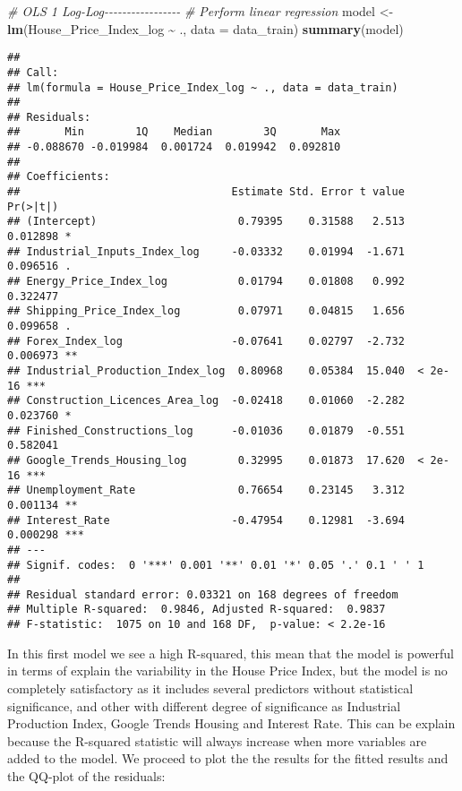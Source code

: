 \documentclass[
]{article}
\newenvironment{Shaded}{\begin{snugshade}}{\end{snugshade}}
\newcommand{\AttributeTok}[1]{\textcolor[rgb]{0.13,0.29,0.53}{#1}}
\newcommand{\CommentTok}[1]{\textcolor[rgb]{0.56,0.35,0.01}{\textit{#1}}}
\newcommand{\FunctionTok}[1]{\textcolor[rgb]{0.13,0.29,0.53}{\textbf{#1}}}
\newcommand{\NormalTok}[1]{#1}
\newcommand{\OtherTok}[1]{\textcolor[rgb]{0.56,0.35,0.01}{#1}}
\newcommand{\SpecialCharTok}[1]{\textcolor[rgb]{0.81,0.36,0.00}{\textbf{#1}}}
\begin{document}
\begin{Shaded}
\begin{Highlighting}[]
\CommentTok{\# OLS 1 Log{-}Log{-}{-}{-}{-}{-}{-}{-}{-}{-}{-}{-}{-}{-}{-}{-}{-}{-}}
\CommentTok{\# Perform linear regression}
\NormalTok{model }\OtherTok{\textless{}{-}} \FunctionTok{lm}\NormalTok{(House\_Price\_Index\_log }\SpecialCharTok{\textasciitilde{}}\NormalTok{ ., }\AttributeTok{data =}\NormalTok{ data\_train)  }
\FunctionTok{summary}\NormalTok{(model)}
\end{Highlighting}
\end{Shaded}

\begin{verbatim}
## 
## Call:
## lm(formula = House_Price_Index_log ~ ., data = data_train)
## 
## Residuals:
##       Min        1Q    Median        3Q       Max 
## -0.088670 -0.019984  0.001724  0.019942  0.092810 
## 
## Coefficients:
##                                 Estimate Std. Error t value Pr(>|t|)    
## (Intercept)                      0.79395    0.31588   2.513 0.012898 *  
## Industrial_Inputs_Index_log     -0.03332    0.01994  -1.671 0.096516 .  
## Energy_Price_Index_log           0.01794    0.01808   0.992 0.322477    
## Shipping_Price_Index_log         0.07971    0.04815   1.656 0.099658 .  
## Forex_Index_log                 -0.07641    0.02797  -2.732 0.006973 ** 
## Industrial_Production_Index_log  0.80968    0.05384  15.040  < 2e-16 ***
## Construction_Licences_Area_log  -0.02418    0.01060  -2.282 0.023760 *  
## Finished_Constructions_log      -0.01036    0.01879  -0.551 0.582041    
## Google_Trends_Housing_log        0.32995    0.01873  17.620  < 2e-16 ***
## Unemployment_Rate                0.76654    0.23145   3.312 0.001134 ** 
## Interest_Rate                   -0.47954    0.12981  -3.694 0.000298 ***
## ---
## Signif. codes:  0 '***' 0.001 '**' 0.01 '*' 0.05 '.' 0.1 ' ' 1
## 
## Residual standard error: 0.03321 on 168 degrees of freedom
## Multiple R-squared:  0.9846, Adjusted R-squared:  0.9837 
## F-statistic:  1075 on 10 and 168 DF,  p-value: < 2.2e-16
\end{verbatim}

In this first model we see a high R-squared, this mean that the model is
powerful in terms of explain the variability in the House Price Index,
but the model is no completely satisfactory as it includes several
predictors without statistical significance, and other with different
degree of significance as Industrial Production Index, Google Trends
Housing and Interest Rate. This can be explain because the R-squared
statistic will always increase when more variables are added to the
model. We proceed to plot the the results for the fitted results and the
QQ-plot of the residuals:
\end{document}
